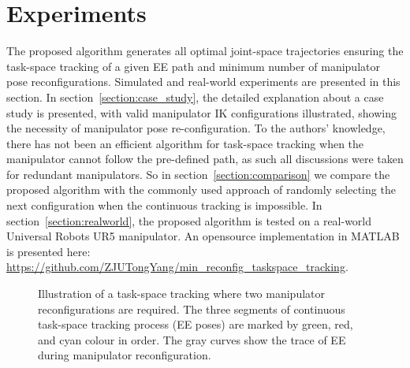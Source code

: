\documentclass[letterpaper, 10 pt, conference]{ieeeconf}  %
\begin{document}
\section{Experiments}\label{section:experiments}
The proposed algorithm generates all optimal joint-space trajectories ensuring the task-space tracking of a given EE path and minimum number of manipulator pose reconfigurations. Simulated and real-world experiments are presented in this section. 
In section~\ref{section:case_study}, the detailed explanation about a case study is presented, with valid  manipulator IK configurations illustrated, showing the necessity of manipulator pose re-configuration. 
To the authors' knowledge, there has not been an efficient algorithm for task-space tracking when the manipulator cannot follow the pre-defined path, as such all discussions were taken for redundant manipulators. So in section~\ref{section:comparison} we compare the proposed algorithm with the commonly used approach of randomly selecting the next configuration when the continuous tracking is impossible.
In section~\ref{section:realworld}, the proposed algorithm is tested on a real-world Universal Robots UR5 manipulator. 
An opensource implementation in MATLAB is presented here: \url{https://github.com/ZJUTongYang/min_reconfig_taskspace_tracking}. 

\begin{figure}[t]
\centering
{}
\caption{Illustration of a task-space tracking where two manipulator reconfigurations are required. The three segments of continuous task-space tracking process (EE poses) are marked by green, red, and cyan colour in order. The gray curves show the trace of EE during manipulator reconfiguration. }\label{fig:case_study}
\end{figure}
\end{document}
